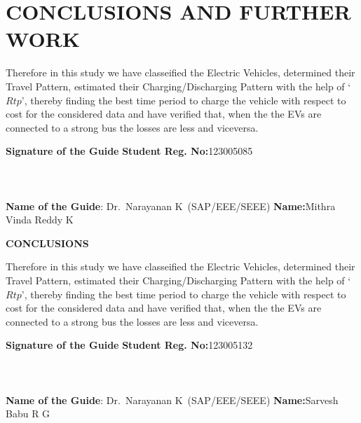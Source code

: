 	\chapter{CONCLUSIONS AND FURTHER WORK}
	\label{chap:conclusion}
	
	
	Therefore in this study we have classeified the Electric Vehicles, determined their Travel Pattern, estimated their Charging/Discharging Pattern with the help of `$Rtp$', thereby finding the best time period to charge the vehicle with respect to cost for the considered data and have verified that, when the the EVs are connected to a strong bus the losses are less and viceversa.
	
	
	\vspace*{24pt}
	
	\noindent \textbf{Signature of the Guide} \hspace*{69mm} \textbf{Student Reg. No:}123005085\\
		\\
	\\
	\\
\noindent \textbf{Name of the Guide}:{ Dr.~Narayanan K}~(SAP/EEE/SEEE) \hspace*{7mm} \textbf{Name:}Mithra Vinda Reddy K
\pagebreak
	\pagebreak
	

	\begin{center}
		\Large{{\textbf{CONCLUSIONS}}}
	\end{center}
	Therefore in this study we have classeified the Electric Vehicles, determined their Travel Pattern, estimated their Charging/Discharging Pattern with the help of `$Rtp$', thereby finding the best time period to charge the vehicle with respect to cost for the considered data and have verified that, when the the EVs are connected to a strong bus the losses are less and viceversa.
	
	
	\vspace*{24pt}
	
	\noindent \textbf{Signature of the Guide} \hspace*{66mm} \textbf{Student Reg. No:}123005132\\
		\\
	\\
	\\
\noindent \textbf{Name of the Guide}:{ Dr.~Narayanan K}~(SAP/EEE/SEEE) \hspace*{10 mm} \textbf{Name:}Sarvesh Babu R G
\pagebreak
	\pagebreak
	
